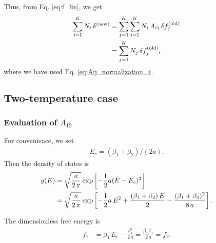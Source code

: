 \documentclass[aip,jcp,preprint,notitlepage, superscriptaddress]{revtex4-1}
\begin{document}
Thus, from Eq. \eqref{eq:f_lin}, we get
%
\begin{align}
  \sum_{i = 1}^K
    N_i \, \delta^\mathrm{(new)}
&=
  \sum_{j = 1}^K
    \sum_{i = 1}^K
      N_i \, A_{ij}
    \, \delta f_j^\mathrm{(old)} \notag \\
&=
  \sum_{j = 1}^K
    N_j \, \delta f_j^\mathrm{(old)},
  \notag
\end{align}
%
where we have used Eq. \eqref{eq:Aij_normalization_i}.




\subsection{Two-temperature case}

\subsubsection{Evaluation of $A_{12}$}



For convenience,
we set
\begin{align}
  E_c = (\beta_1 + \beta_2)/(2a).
  \label{eq:Ec_twoT}
\end{align}
%
Then the density of states is
%
\begin{align}
g(E)
&=
\sqrt{ \frac a { 2 \, \pi } }
\exp
\left[
  -\frac 1 2 a
  (E - E_c)^2
\right]
\notag \\
&=
\sqrt{ \frac a { 2 \, \pi } }
\exp
\left[
  -\frac 1 2 a \, E^2
  + \frac{
    (\beta_1 + \beta_2) \, E
  }{2}
  - \frac{
    (\beta_1 + \beta_2)^2
  }{ 8 \, a }
\right].
\end{align}


The dimensionless free energy is
%
\begin{align}
f_1
&=
\beta_1 \, E_c
- \frac{ \beta_1^2 } { 2 \, a }
=
\frac{\beta_1 \, \beta_2 } { 2 \, a }
= f_2.
\end{align}
\end{document}
